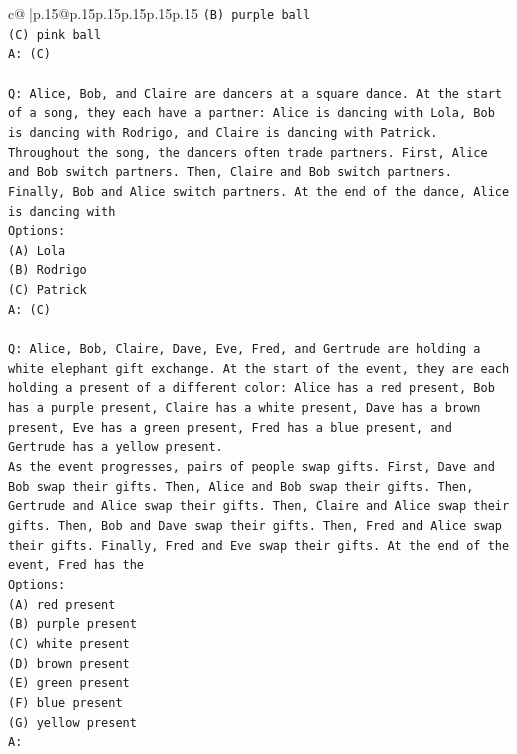 \documentclass{article}
\begin{document}
{\begin{supertabular}{c@{$\;$}|p{.15\linewidth}@{}p{.15\linewidth}p{.15\linewidth}p{.15\linewidth}p{.15\linewidth}p{.15\linewidth}}
{{{\texttt{(B) purple ball} \\
\texttt{(C) pink ball} \\
\texttt{A: (C)} \\
\\ 
\texttt{Q: Alice, Bob, and Claire are dancers at a square dance. At the start of a song, they each have a partner: Alice is dancing with Lola, Bob is dancing with Rodrigo, and Claire is dancing with Patrick.} \\
\texttt{Throughout the song, the dancers often trade partners. First, Alice and Bob switch partners. Then, Claire and Bob switch partners. Finally, Bob and Alice switch partners. At the end of the dance, Alice is dancing with} \\
\texttt{Options:} \\
\texttt{(A) Lola} \\
\texttt{(B) Rodrigo} \\
\texttt{(C) Patrick} \\
\texttt{A: (C)} \\
\\ 
\texttt{Q: Alice, Bob, Claire, Dave, Eve, Fred, and Gertrude are holding a white elephant gift exchange. At the start of the event, they are each holding a present of a different color: Alice has a red present, Bob has a purple present, Claire has a white present, Dave has a brown present, Eve has a green present, Fred has a blue present, and Gertrude has a yellow present.} \\
\texttt{As the event progresses, pairs of people swap gifts. First, Dave and Bob swap their gifts. Then, Alice and Bob swap their gifts. Then, Gertrude and Alice swap their gifts. Then, Claire and Alice swap their gifts. Then, Bob and Dave swap their gifts. Then, Fred and Alice swap their gifts. Finally, Fred and Eve swap their gifts. At the end of the event, Fred has the} \\
\texttt{Options:} \\
\texttt{(A) red present} \\
\texttt{(B) purple present} \\
\texttt{(C) white present} \\
\texttt{(D) brown present} \\
\texttt{(E) green present} \\
\texttt{(F) blue present} \\
\texttt{(G) yellow present} \\
\texttt{A:} \\
            }
        }
    }
     \\ \\


\end{supertabular}}
\end{document}
